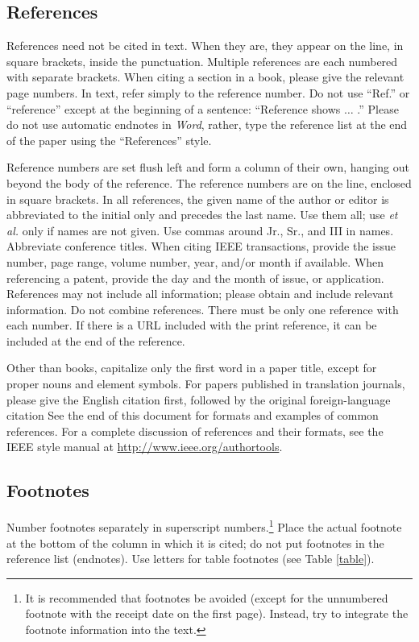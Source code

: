 \documentclass[journal,twoside,web]{ieeecolor}
\begin{document}
\subsection{References}
References need not be cited in text. When they are, they appear on the 
line, in square brackets, inside the punctuation. Multiple references are 
each numbered with separate brackets. When citing a section in a book, 
please give the relevant page numbers. In text, refer simply to the 
reference number. Do not use ``Ref.'' or ``reference'' except at the 
beginning of a sentence: ``Reference \cite{b3} shows $\ldots$ .'' Please do not use 
automatic endnotes in \emph{Word}, rather, type the reference list at the end of the 
paper using the ``References'' style.

Reference numbers are set flush left and form a column of their own, hanging 
out beyond the body of the reference. The reference numbers are on the line, 
enclosed in square brackets. In all references, the given name of the author 
or editor is abbreviated to the initial only and precedes the last name. Use 
them all; use \emph{et al.} only if names are not given. Use commas around Jr., 
Sr., and III in names. Abbreviate conference titles. When citing IEEE 
transactions, provide the issue number, page range, volume number, year, 
and/or month if available. When referencing a patent, provide the day and 
the month of issue, or application. References may not include all 
information; please obtain and include relevant information. Do not combine 
references. There must be only one reference with each number. If there is a 
URL included with the print reference, it can be included at the end of the 
reference. 

Other than books, capitalize only the first word in a paper title, except 
for proper nouns and element symbols. For papers published in translation 
journals, please give the English citation first, followed by the original 
foreign-language citation See the end of this document for formats and 
examples of common references. For a complete discussion of references and 
their formats, see the IEEE style manual at
\underline{http://www.ieee.org/authortools}.

\subsection{Footnotes}
Number footnotes separately in superscript numbers.\footnote{It is recommended that footnotes be avoided (except for 
the unnumbered footnote with the receipt date on the first page). Instead, 
try to integrate the footnote information into the text.} Place the actual 
footnote at the bottom of the column in which it is cited; do not put 
footnotes in the reference list (endnotes). Use letters for table footnotes 
(see Table \ref{table}).
\end{document}
